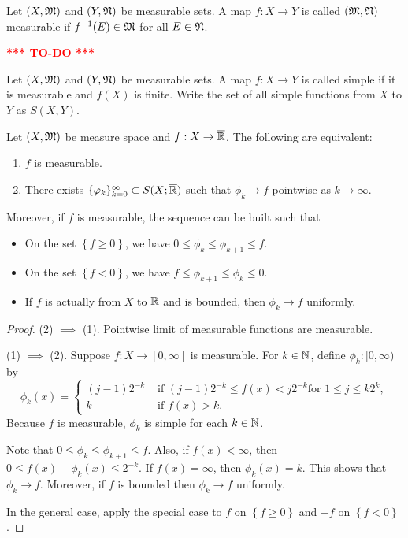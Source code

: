 \documentclass[a4paper]{article}
\newcommand{\TODO}{\textcolor{red}{\textbf{*** TO-DO ***}}}
\begin{document}
\begin{defi}
  Let $(X, \mathfrak{M})$ and $(Y, \mathfrak{N})$ be measurable sets. A map
  $f : X \to Y$ is called $(\mathfrak{M}, \mathfrak{N})$ measurable if $f^{-1}(E)
  \in \mathfrak{M}$ for all $E \in \mathfrak{N}$.
\end{defi}

\TODO

\begin{defi}
  Let $(X, \mathfrak{M})$ and $(Y, \mathfrak{N})$ be measurable sets. A map
  $f : X \to Y$ is called simple if it is
  measurable and $f(X)$ is finite. Write the set of all
  simple functions from $X$ to $Y$ as
  $S(X, Y)$.
\end{defi}

\begin{thm}
  Let $(X, \mathfrak{M})$ be measure space and $f : X \to \overline{\mathbb{R}}$. The
  following are equivalent:
  \begin{enumerate}
    \item $f$ is measurable.
    \item There exists $\{ \varphi_k \}_{k=0}^\infty \subset S(X; \overline{\mathbb{R}})$ such that
    $\phi_k \to f$ pointwise as $k \to \infty$.
  \end{enumerate}
  Moreover, if $f$ is measurable, the sequence can be built such that
  \begin{itemize}
    \item On the set $\left\{ f \geq 0 \right\}$, we have
    $0 \leq \phi_k \leq \phi_{k+1} \leq f$.
    \item On the set $\left\{ f < 0 \right\}$, we have
    $f \leq \phi_{k+1} \leq \phi_k \leq 0$.
    \item If $f$ is actually from $X$ to $\mathbb{R}$ and is bounded,
    then $\phi_k \to f$ uniformly.
  \end{itemize}
\end{thm}

\begin{proof}
  (2) $\implies$ (1). Pointwise limit of measurable
  functions are measurable.

  (1) $\implies$ (2). Suppose $f : X \to [0, \infty]$
  is measurable. For $k \in \mathbb{N}$, define
  $\phi_k : [0, \infty)$ by
  \[
  \phi_k(x) = \begin{cases}
    (j - 1)2^{-k} & \text{ if
    $(j - 1)2^{-k} \leq f(x) < j 2^{-k}$
    for $1 \leq j \leq k 2^k$}, \\
    k & \text{ if $f(x) > k$}.
  \end{cases}
  \]
  Because $f$ is measurable, $\phi_k$ is simple for each
  $k \in \mathbb{N}$.

  Note that $0 \leq \phi_k \leq \phi_{k+1} \leq f$. Also,
  if $f(x) < \infty$, then $0 \leq f(x) - \phi_k(x) \leq
  2^{-k}$. If $f(x) = \infty$, then $\phi_k(x) = k$.
  This shows that $\phi_k \to f$. Moreover,
  if $f$ is bounded then $\phi_k \to f$ uniformly.

  In the general case, apply the special case to $f$ on
  $\left\{ f \geq 0 \right\}$ and $-f$ on
  $\left\{ f < 0 \right\}$.

\end{proof}
\end{document}
